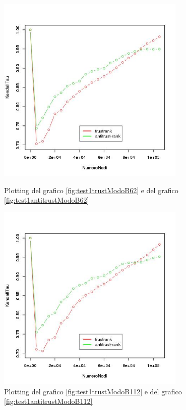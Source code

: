  \begin{figure}
\centering
 \includegraphics[height=9cm]{immagini/test1/coplotTrustAnti_62}
 \caption{Plotting del grafico \ref{fig:test1trustModoB62} e del  grafico \ref{fig:test1antitrustModoB62}}
 \label{fig:test1coplot62}
\centering
 \includegraphics[height=9cm]{immagini/test1/coplotTrustAnti_112}
 \caption{Plotting del grafico \ref{fig:test1trustModoB112} e del  grafico \ref{fig:test1antitrustModoB112}}
 \label{fig:test1coplot112}
\end{figure}

